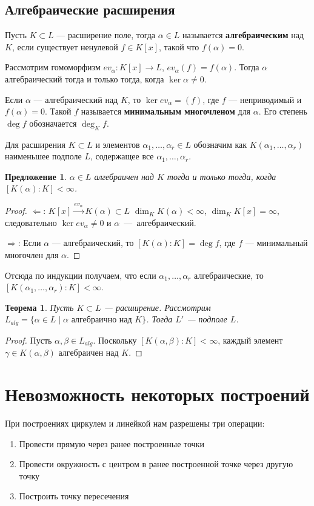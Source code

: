 \documentclass[a4paper]{article}
\newtheorem{theorem}{Теорема}
\numberwithin{theorem}{section}
\numberwithin{lemma}{section}
\newtheorem{proposition}{Предложение}
\numberwithin{proposition}{section}
\numberwithin{corollary}{section}
\begin{document}
\subsection*{Алгебраические расширения}
Пусть $K \subset L$ --- расширение поле, тогда $\alpha \in L$
называется \textbf{алгебраическим} над $K$, если существует ненулевой
$f \in K[x]$, такой что $f(\alpha) = 0$.

Рассмотрим гомоморфизм $ev_\alpha: K[x] \to L$, $ev_\alpha(f) = f(\alpha)$. Тогда $\alpha$ алгебраический тогда и только тогда,
когда $\ker \alpha \ne 0$.

Если $\alpha$ --- алгебраический над $K$, то $\ker ev_\alpha = (f)$,
где $f$ --- неприводимый и $f(\alpha) = 0$. Такой $f$ называется
\textbf{минимальным многочленом} для $\alpha$. Его степень $\deg f$ обозначается $\deg_K f$.

Для расширения $K \subset L$ и
элементов $\alpha_1, \dots, \alpha_r \in L$
обозначим как $K(\alpha_1, \dots, \alpha_r)$ наименьшее подполе $L$,
содержащее все $\alpha_1, \dots, \alpha_r$.

\begin{proposition}
$\alpha \in L$ алгебраичен над $K$ тогда и только тогда,
когда $[K(\alpha) : K] < \infty$.
\end{proposition}
\begin{proof}
$\Leftarrow$: $K[x] \xrightarrow{ev_\alpha} K(\alpha) \subset L$
$\dim_K K(\alpha) < \infty$, $\dim_K K[x] = \infty$, следовательно
$\ker ev_\alpha \ne 0$ и $\alpha$~---~алгебраический.

$\Rightarrow$: Если $\alpha$ --- алгебраический, то $[K(\alpha) : K] = \deg f$, где $f$ --- минимальный многочлен для $\alpha$.
\end{proof}

Отсюда по индукции получаем, что если $\alpha_1, \dots, \alpha_r$ алгебраические, то $[K(\alpha_1, \dots, \alpha_r) : K] < \infty$.

\begin{theorem}
Пусть $K \subset L$ --- расширение.
Рассмотрим $L_{alg} = \{\alpha \in L \mid  \text{$\alpha$ алгебраично над $K$}\}$.
Тогда $L'$ --- подполе $L$.
\end{theorem}
\begin{proof}
Пусть $\alpha, \beta \in L_{alg}$.
Поскольку $[K(\alpha, \beta) : K] < \infty$, каждый элемент $\gamma \in K(\alpha, \beta)$ алгебраичен над $K$.
\end{proof}

\section{Невозможность некоторых построений}
При построениях циркулем и линейкой нам разрешены три операции:
\begin{enumerate}
    \item Провести прямую через ранее построенные точки
    \item Провести окружность с центром в ранее построенной точке через другую точку
    \item Построить точку пересечения
\end{enumerate}
\end{document}
